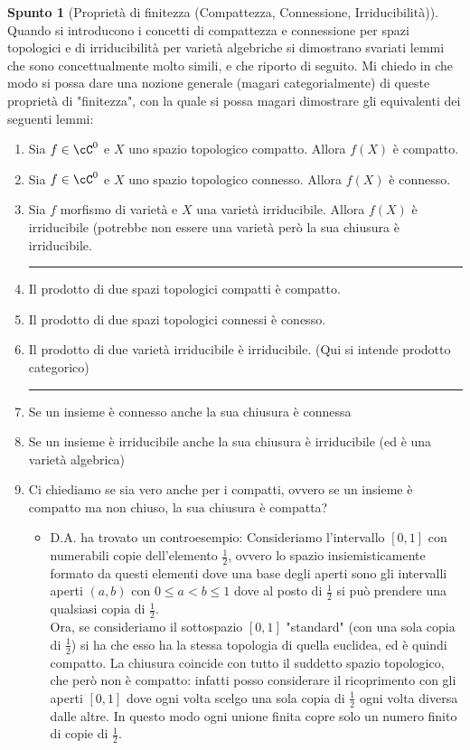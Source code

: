 \documentclass[a4paper,NoNotes,GeneralMath]{stdmdoc}
\theoremstyle{definition}
\newtheorem{spunto}{Spunto}
\begin{document}
	\begin{spunto}[Proprietà di finitezza (Compattezza, Connessione, Irriducibilità)]
		Quando si introducono i concetti di compattezza e connessione per spazi topologici e di irriducibilità per varietà algebriche si dimostrano svariati lemmi che sono concettualmente molto simili, e che riporto di seguito. Mi chiedo in che modo si possa dare una nozione generale (magari categorialmente) di queste proprietà di "finitezza", con la quale si possa magari dimostrare gli equivalenti dei seguenti lemmi: \\
		\begin{enumerate}
			\item Sia $f \in \cC^0$ e $X$ uno spazio topologico compatto. Allora $f(X)$ è compatto.
			\item Sia $f \in \cC^0$ e $X$ uno spazio topologico connesso. Allora $f(X)$ è connesso.
			\item Sia $f$ morfismo di varietà e $X$ una varietà irriducibile. Allora $f(X)$ è irriducibile (potrebbe non essere una varietà però la sua chiusura è irriducibile. \hrule
			\item Il prodotto di due spazi topologici compatti è compatto.
			\item Il prodotto di due spazi topologici connessi è conesso.
			\item Il prodotto di due varietà irriducibile è irriducibile. (Qui si intende prodotto categorico) \hrule
			\item Se un insieme è connesso anche la sua chiusura è connessa
			\item Se un insieme è irriducibile anche la sua chiusura è irriducibile (ed è una varietà algebrica)
			\item Ci chiediamo se sia vero anche per i compatti, ovvero se un insieme è compatto ma non chiuso, la sua chiusura è compatta? \\
				\begin{itemize}
					\item D.A. ha trovato un controesempio: Consideriamo l'intervallo $[0,1]$ con numerabili copie dell'elemento $\frac{1}{2}$, ovvero lo spazio insiemisticamente formato da questi elementi dove una base degli aperti sono gli intervalli aperti $(a, b)$ con $0 \le a < b \le 1$ dove al posto di $\frac{1}{2}$ si può prendere una qualsiasi copia di $\frac{1}{2}$. \\
					Ora, se consideriamo il sottospazio $[0,1]$ "standard" (con una sola copia di $\frac{1}{2}$) si ha che esso ha la stessa topologia di quella euclidea, ed è quindi compatto. La chiusura coincide con tutto il suddetto spazio topologico, che però non è compatto: infatti posso considerare il ricoprimento con gli aperti $[0, 1]$ dove ogni volta scelgo una sola copia di $\frac{1}{2}$ ogni volta diversa dalle altre. In questo modo ogni unione finita copre solo un numero finito di copie di $\frac{1}{2}$.

\end{itemize}
\end{enumerate}
\end{spunto}
\end{document}
